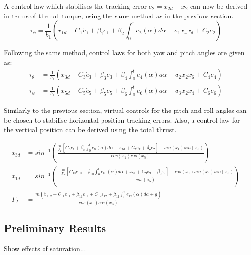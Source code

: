 A control law which stabilises the tracking error $e_{2}=x_{2d}-x_{2}$ can now be derived in terms of the roll torque, using the same method as in the previous section:
\begin{equation}
\tau_{\phi}=\frac{1}{b_{1}} \left( \ddot{x}_{1d}+C_{1}\dot{e}_{1}+\beta_{1}e_{1}+\beta_{2}\int^{t}_{0} e_{2}(\alpha) d\alpha -a_{1}x_{4}x_{6}+C_{2}e_{2}\right)
\end{equation}

Following the same method, control laws for both yaw and pitch angles are given as:
\begin{equation}\label{eqn:IntBackstepAngleLaws}
\begin{split}
\tau_{\theta}&=\frac{1}{b_{2}}\left(\ddot{x}_{3d}+C_{3}\dot{e}_{3}+\beta_{3}e_{3}+\beta_{4}\int^{t}_{0} e_{4}(\alpha) d\alpha -a_{2}x_{2}x_{6}+C_{4}e_{4}\right)\\
\tau_{\psi}&=\frac{1}{b_{3}}\left(\ddot{x}_{5d}+C_{5}\dot{e}_{5}+\beta_{5}e_{5}+\beta_{6}\int^{t}_{0} e_{6}(\alpha) d\alpha -a_{3}x_{2}x_{4}+C_{6}e_{6}\right)
\end{split}
\end{equation}

Similarly to the previous section, virtual controls for the pitch and roll angles can be chosen to stabilise horizontal position tracking errors. Also, a control law for the vertical position can be derived using the total thrust.


\begin{equation}\label{eqn:IntBackPosContLaw}
\begin{split}
x_{3d}&=sin^{-1}\left(\frac{\frac{m}{F_{T}}[C_{8}e_{8}+\beta_{8}\int^{t}_{0} e_{8}(\alpha) d\alpha + \ddot{x}_{7d}+C_{7}\dot{e}_{7}+\beta_{7}e_{7}]-sin(x_{1})sin(x_{5})}{cos(x_{1})cos(x_{5})}\right)\\
x_{1d}&=sin^{-1}\left(\frac{-\frac{m}{F_{T}}[C_{10}e_{10}+\beta_{10}\int^{t}_{0} e_{10}(\alpha) d\alpha +\ddot{x}_{9d}+C_{9}\dot{e}_{9}+\beta_{9}e_{9}]+cos(x_{1})sin(x_{3})sin(x_{5})}{cos(x_{5})}\right)\\
F_{T}&=\frac{m\left(\ddot{x}_{11d}+C_{11}\dot{e}_{11}+\beta_{11}e_{11}+C_{12}e_{12}+\beta_{12}\int^{t}_{0} e_{12}(\alpha) d\alpha +g\right)}{cos(x_{1})cos(x_{3})}
\end{split}
\end{equation}


\subsection{Preliminary Results}
Show effects of saturation...

